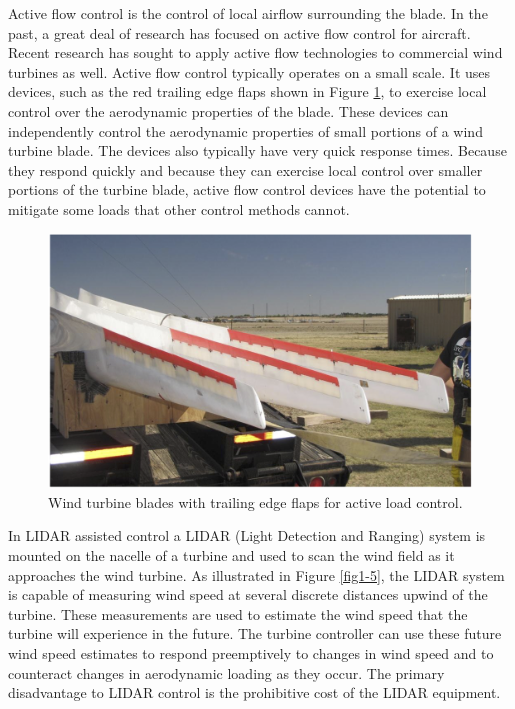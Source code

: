 Active flow control is the control of local airflow surrounding the blade.  In the past, a great deal of research has focused on active flow control for aircraft. Recent research has sought to apply active flow technologies to commercial wind turbines as well. Active flow control typically operates on a small scale.  It uses devices, such as the red trailing edge flaps shown in Figure \ref{fig1-4}, to exercise local control over the aerodynamic properties of the blade.  These devices can independently control the aerodynamic properties of small portions of a wind turbine blade.  The devices also typically have very quick response times.  Because they respond quickly and because they can exercise local control over smaller portions of the turbine blade, active flow control devices have the potential to mitigate some loads that other control methods cannot.  



\begin{figure}[htbp]
	\centering
		\includegraphics[width=.75\linewidth]{Figures/ch1Figures/fig1-4.png}
	\caption{Wind turbine blades with trailing edge flaps for active load control.\cite{berg2012}}
	\label{fig1-4}
\end{figure}

In LIDAR assisted control a LIDAR (Light Detection and Ranging) system is mounted on the nacelle of a turbine and used to scan the wind field as it approaches the wind turbine.  As illustrated in Figure \ref{fig1-5}, the LIDAR system is capable of measuring wind speed at several discrete distances upwind of the turbine.  These measurements are used to estimate the wind speed that the turbine will experience in the future.  The turbine controller can use these future wind speed estimates to respond preemptively to changes in wind speed and to counteract changes in aerodynamic loading as they occur. The primary disadvantage to LIDAR control is the prohibitive cost of the LIDAR equipment.  

